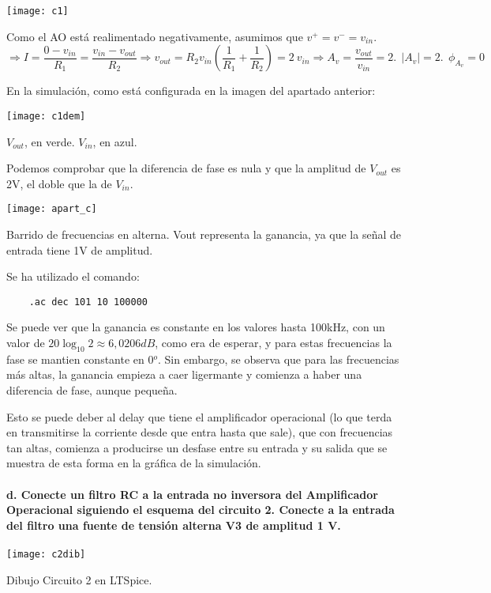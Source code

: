 \documentclass{article}
\begin{document}
\centerline{\texttt{[image: c1]}}

Como el AO está realimentado negativamente, asumimos que $v^+=v^-=v_{in}$. 
$$\Rightarrow I=\frac{0-v_{in}}{R_1}=\frac{v_{in}-v_{out}}{R_2}\Rightarrow v_{out}=R_2 v_{in} \left( \frac{1}{R_1}+\frac{1}{R_2}\right)=2\ v_{in}\Rightarrow A_v=\frac{v_{out}}{v_{in}}=2.\ \ |A_v|=2.\ \ \phi_{A_v}=0$$

En la simulación, como está configurada en la imagen del apartado anterior:
\begin{center}
\centerline{\texttt{[image: c1dem]}}

$V_{out}$, en verde. $V_{in}$, en azul.
\end{center}
Podemos comprobar que la diferencia de fase es nula y que la amplitud de $V_{out}$ es 2V, el doble que la de $V_{in}$.

\begin{center}
\centerline{\texttt{[image: apart\_c]}}
Barrido de frecuencias en alterna. Vout representa la ganancia, ya que la señal de entrada tiene 1V de amplitud. 
\end{center}
Se ha utilizado el comando:
\begin{verbatim}
	.ac dec 101 10 100000
\end{verbatim}

Se puede ver que la ganancia es constante en los valores hasta 100kHz, con un valor de $20\log_{10}{2}\approx 6,0206dB$, como era de esperar, y para estas frecuencias la fase se mantien constante en 0$^o$. Sin embargo, se observa que para las frecuencias más altas, la ganancia empieza a caer ligermante y comienza a haber una diferencia de fase, aunque pequeña. 

Esto se puede deber al delay que tiene el amplificador operacional (lo que terda en transmitirse la corriente desde que entra hasta que sale), que con frecuencias tan altas, comienza a producirse un desfase entre su entrada y su salida que se muestra de esta forma en la gráfica de la simulación.
\cleardoublepage

\paragraph{d. Conecte un filtro RC a la entrada no inversora del Amplificador Operacional siguiendo el
esquema del circuito 2. Conecte a la entrada del filtro una fuente de tensión alterna V3 de
amplitud 1 V.\\}

\begin{center}
\centerline{\texttt{[image: c2dib]}}

Dibujo Circuito 2 en LTSpice.
\end{center}
\end{document}
